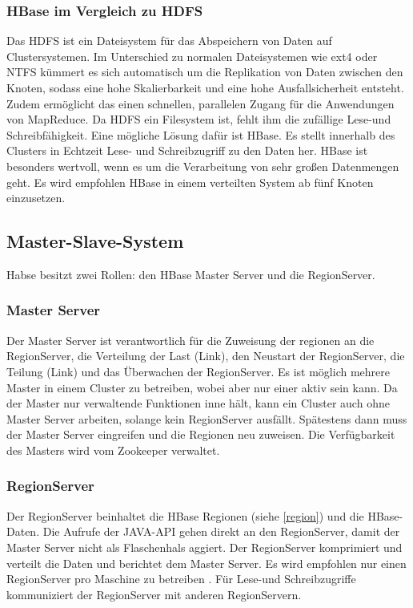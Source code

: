 \subsubsection{HBase im Vergleich zu HDFS}
Das \ac{HDFS} ist ein Dateisystem für das Abspeichern von Daten auf Clustersystemen. Im Unterschied zu normalen Dateisystemen wie ext4 oder NTFS kümmert es sich automatisch um die Replikation von Daten zwischen den Knoten,  
sodass eine hohe Skalierbarkeit und eine hohe Ausfallsicherheit entsteht. Zudem ermöglicht das einen schnellen, parallelen Zugang für die Anwendungen von MapReduce. Da HDFS ein Filesystem ist, fehlt ihm die zufällige Lese-und Schreibfähigkeit. Eine mögliche Lösung dafür ist HBase. Es stellt innerhalb des Clusters in Echtzeit Lese- und Schreibzugriff zu den Daten her. HBase ist besonders wertvoll, wenn es um die Verarbeitung von sehr großen Datenmengen geht. Es wird empfohlen HBase in einem verteilten System ab fünf Knoten einzusetzen.

\subsection{Master-Slave-System}
Habse besitzt zwei Rollen: den HBase Master Server und die RegionServer.

\subsubsection{Master Server}
Der Master Server ist verantwortlich für die Zuweisung der regionen an die RegionServer, die Verteilung der Last (Link), den Neustart der RegionServer, die Teilung (Link) und das Überwachen der RegionServer. Es ist möglich mehrere Master in einem Cluster zu betreiben, wobei aber nur einer aktiv sein kann. Da der Master nur verwaltende Funktionen inne hält, kann ein Cluster auch ohne Master Server arbeiten, solange kein RegionServer ausfällt. Spätestens dann muss der Master Server eingreifen und die Regionen neu zuweisen. Die Verfügbarkeit des Masters wird vom Zookeeper verwaltet.

\subsubsection{RegionServer}
Der RegionServer beinhaltet die HBase Regionen (siehe \ref{region}) und die HBase-Daten. Die Aufrufe der JAVA-API gehen direkt an den RegionServer, damit der Master Server nicht als Flaschenhals aggiert. Der RegionServer komprimiert und verteilt die Daten und berichtet dem Master Server. Es wird empfohlen nur einen RegionServer pro Maschine zu betreiben \cite{Redt01}. Für Lese-und Schreibzugriffe kommuniziert der RegionServer mit anderen RegionServern.

